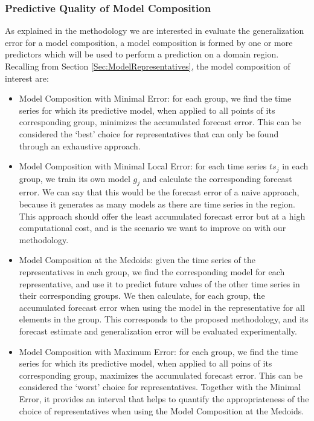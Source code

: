\subsubsection{Predictive Quality of Model Composition}
\label{Sec:ModelComposition}

As explained in the methodology we are interested in evaluate the generalization error for a model composition, a model composition is formed by one or more predictors which will be used to perform a prediction on a domain region. Recalling from Section \ref{Sec:ModelRepresentatives}, the model composition of interest are:

\begin{itemize}%
	\item Model Composition with Minimal Error: for each group, we find the time series for which its predictive model, when applied to all points of its corresponding group, minimizes the accumulated forecast error. This can be considered the `best' choice for representatives that can only be found through an exhaustive approach.
	\item Model Composition with Minimal Local Error: for each time series $ts_j$ in each group, we train its own model $g_j$ and calculate the corresponding forecast error. We can say that this would be the forecast error of a naive approach, because it generates as many models as there are time series in the region. This approach should offer the least accumulated forecast error but at a high computational cost, and is the scenario we want to improve on with our methodology.
	\item Model Composition at the Medoids: given the time series of the representatives in each group, we find the corresponding model for each representative, and use it to predict future values of the other time series in their corresponding groups. We then calculate, for each group, the accumulated forecast error when using the model in the representative for all elements in the group. This corresponds to the proposed methodology, and its forecast estimate and generalization error will be evaluated experimentally.
	\item Model Composition with Maximum Error: for each group, we find the time series for which its predictive model, when applied to all poins of its corresponding group, maximizes the accumulated forecast error. This can be considered the `worst' choice for representatives. Together with the Minimal Error, it provides an interval that helps to quantify the appropriateness of the choice of representatives when using the Model Composition at the Medoids.
\end{itemize}

